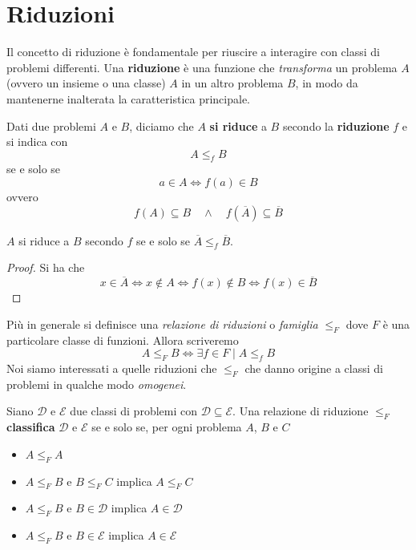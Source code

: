 \section{Riduzioni}
Il concetto di riduzione è fondamentale per riuscire a interagire
con classi di problemi differenti. Una \textbf{riduzione} è una
funzione che \emph{transforma} un problema $A$ (ovvero un insieme
o una classe) $A$ in un altro problema $B$, in modo da mantenerne
inalterata la caratteristica principale.

\begin{definition} \label{def: riduzione}
	Dati due problemi $A$ e $B$, diciamo che $A$ \textbf{si riduce}
	a $B$ secondo la \textbf{riduzione} $f$ e si indica con
	\[ A \leq_f B \]
	se e solo se
	\[ a \in A \iff f(a) \in B \]
	ovvero
	\[
		f(A) \subseteq B \quad \land
		\quad f(\overline{A}) \subseteq \overline{B}
	\]
\end{definition}

\begin{property} \label{prop: riduzione_comp}
	$A$ si riduce a $B$ secondo $f$ se e solo se
	$\overline{A} \leq_f \overline{B}$.
	\begin{proof}
		Si ha che
		\[
			x \in \overline{A} \iff x \notin A \iff
			f(x) \notin B \iff f(x) \in \overline{B}
		\]
	\end{proof}
\end{property}

Più in generale si definisce una \emph{relazione di riduzioni}
o \emph{famiglia} $\leq_F$ dove $F$ è una particolare classe di
funzioni. Allora scriveremo
\[ A \leq_F B \iff \exists f \in F \mid A \leq_f B \]
Noi siamo interessati a quelle riduzioni che $\leq_F$ che danno
origine a classi di problemi in qualche modo \emph{omogenei}.

\begin{lemma} \label{def: classificazione}
	Siano $\mathcal{D}$ e $\mathcal{E}$ due classi di problemi
	con $\mathcal{D} \subseteq \mathcal{E}$. Una relazione di
	riduzione $\leq_F$ \textbf{classifica} $\mathcal{D}$ e
	$\mathcal{E}$ se e solo se, per ogni problema $A$, $B$ e $C$
	\begin{itemize}
		\item $A \leq_F A$
		\item $A \leq_F B$ e $B \leq_F C$ implica $A \leq_F C$
		\item $A \leq_F B$ e $B \in \mathcal{D}$ implica
		      $A \in \mathcal{D}$
		\item $A \leq_F B$ e $B \in \mathcal{E}$ implica
		      $A \in \mathcal{E}$
	\end{itemize}
\end{lemma}

